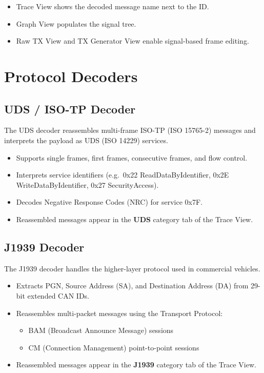 \documentclass[a4paper,11pt]{article}
\newcommand{\ui}[1]{\textbf{#1}}
\begin{document}
\begin{itemize}
  \item Trace View shows the decoded message name next to the ID.
  \item Graph View populates the signal tree.
  \item Raw TX View and TX Generator View enable signal-based frame editing.
\end{itemize}

\section{Protocol Decoders}

\subsection{UDS / ISO-TP Decoder}

The UDS decoder reassembles multi-frame ISO-TP (ISO 15765-2) messages and
interprets the payload as UDS (ISO 14229) services.

\begin{itemize}
  \item Supports single frames, first frames, consecutive frames, and flow control.
  \item Interprets service identifiers (e.g.\ 0x22 ReadDataByIdentifier,
        0x2E WriteDataByIdentifier, 0x27 SecurityAccess).
  \item Decodes Negative Response Codes (NRC) for service 0x7F.
  \item Reassembled messages appear in the \ui{UDS} category tab of the Trace View.
\end{itemize}

\subsection{J1939 Decoder}

The J1939 decoder handles the higher-layer protocol used in commercial vehicles.

\begin{itemize}
  \item Extracts PGN, Source Address (SA), and Destination Address (DA) from
        29-bit extended CAN IDs.
  \item Reassembles multi-packet messages using the Transport Protocol:
    \begin{itemize}
      \item BAM (Broadcast Announce Message) sessions
      \item CM (Connection Management) point-to-point sessions
    \end{itemize}
  \item Reassembled messages appear in the \ui{J1939} category tab of the Trace View.
\end{itemize}
\end{document}
